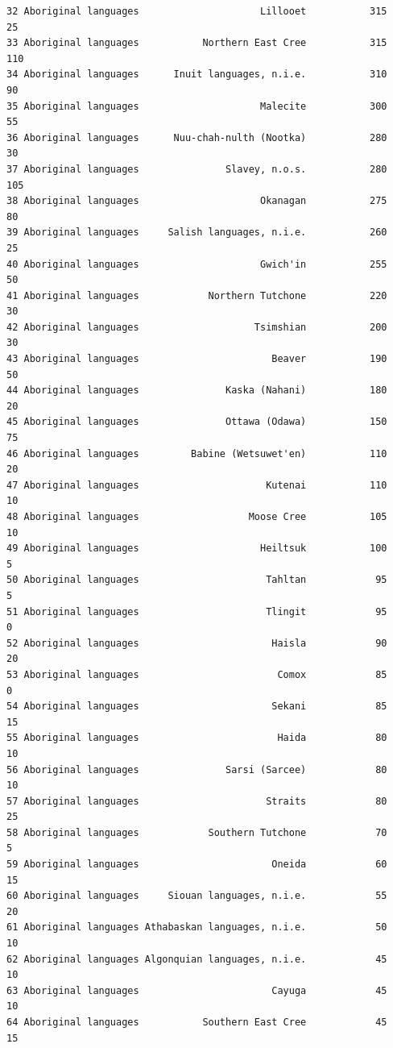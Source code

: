 \documentclass[
  letterpaper,
  DIV=11,
  numbers=noendperiod]{scrartcl}
\begin{document}
\begin{verbatim}
32 Aboriginal languages                     Lillooet           315           25
33 Aboriginal languages           Northern East Cree           315          110
34 Aboriginal languages      Inuit languages, n.i.e.           310           90
35 Aboriginal languages                     Malecite           300           55
36 Aboriginal languages      Nuu-chah-nulth (Nootka)           280           30
37 Aboriginal languages               Slavey, n.o.s.           280          105
38 Aboriginal languages                     Okanagan           275           80
39 Aboriginal languages     Salish languages, n.i.e.           260           25
40 Aboriginal languages                     Gwich'in           255           50
41 Aboriginal languages            Northern Tutchone           220           30
42 Aboriginal languages                    Tsimshian           200           30
43 Aboriginal languages                       Beaver           190           50
44 Aboriginal languages               Kaska (Nahani)           180           20
45 Aboriginal languages               Ottawa (Odawa)           150           75
46 Aboriginal languages         Babine (Wetsuwet'en)           110           20
47 Aboriginal languages                      Kutenai           110           10
48 Aboriginal languages                   Moose Cree           105           10
49 Aboriginal languages                     Heiltsuk           100            5
50 Aboriginal languages                      Tahltan            95            5
51 Aboriginal languages                      Tlingit            95            0
52 Aboriginal languages                       Haisla            90           20
53 Aboriginal languages                        Comox            85            0
54 Aboriginal languages                       Sekani            85           15
55 Aboriginal languages                        Haida            80           10
56 Aboriginal languages               Sarsi (Sarcee)            80           10
57 Aboriginal languages                      Straits            80           25
58 Aboriginal languages            Southern Tutchone            70            5
59 Aboriginal languages                       Oneida            60           15
60 Aboriginal languages     Siouan languages, n.i.e.            55           20
61 Aboriginal languages Athabaskan languages, n.i.e.            50           10
62 Aboriginal languages Algonquian languages, n.i.e.            45           10
63 Aboriginal languages                       Cayuga            45           10
64 Aboriginal languages           Southern East Cree            45           15

\end{verbatim}
\end{document}
